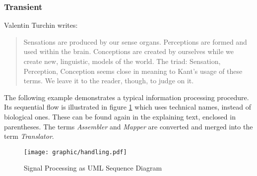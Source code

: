 %
%
%
%
%
%
%

\subsubsection{Transient}
\label{transient_heading}

Valentin Turchin \cite{turchin} writes:

\begin{quote}
    Sensations are produced by our sense organs. Perceptions are formed and used
    within the brain. Conceptions are created by ourselves while we create new,
    linguistic, models of the world.
    The triad: Sensation, Perception, Conception seems close in meaning to Kant's
    usage of these terms. We leave it to the reader, though, to judge on it.
\end{quote}

The following example demonstrates a typical information processing procedure.
Its sequential flow is illustrated in figure \ref{handling_figure} which uses
technical names, instead of biological ones. These can be found again in the
explaining text, enclosed in parentheses. The terms \emph{Assembler} and
\emph{Mapper} are converted and merged into the term \emph{Translator}.

\begin{figure}[ht]
    \begin{center}
        \texttt{[image: graphic/handling.pdf]}
        \caption{Signal Processing as UML Sequence Diagram}
        \label{handling_figure}
    \end{center}
\end{figure}

